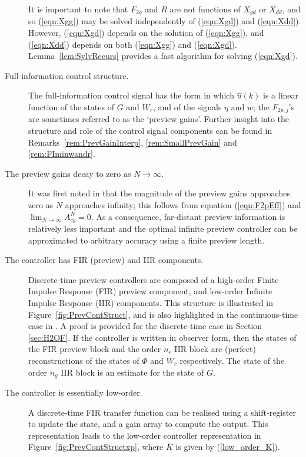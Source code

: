 \begin{description}
It is important to note that $F_{2g}$ and $\bar R$ are not functions of $X_{gd}$ or $X_{dd}$, and so (\ref{eqn:Xgg}) may be solved independently of (\ref{eqn:Xgd}) and (\ref{eqn:Xdd}). However, (\ref{eqn:Xgd}) depends on the solution of (\ref{eqn:Xgg}), and (\ref{eqn:Xdd}) depends on both (\ref{eqn:Xgg}) and (\ref{eqn:Xgd}). Lemma~\ref{lem:SylvRecurs} provides a fast algorithm for solving (\ref{eqn:Xgd}).
\item[Full-information control structure.] The full-information control signal has the form
in which $\hat u(k)$ is a linear function of the states of $G$ and $W_r$, and of the signals $\eta$ and $w$; the $F_{2p,j}$'s are sometimes referred to as the `preview gains'. Further insight into the structure and role of the control signal components can be found in Remarks~\ref{rem:PrevGainInterp}, \ref{rem:SmallPrevGain} and \ref{rem:FIminwandr}.
\item[The preview gains decay to zero as $N \rightarrow \infty$.] It was first noted in \cite{Tomizuka_1975_OptDiscretePreview} that the magnitude of the preview gains approaches zero as $N$ approaches infinity; this follows from equation (\ref{eqn:F2pEff}) and $\lim_{N \rightarrow \infty} A^N_{cg} = 0$. As a consequence, far-distant preview information is relatively less important and the optimal infinite preview controller can be approximated  to arbitrary accuracy using a finite preview length.
\item[The controller has FIR (preview) and IIR components.]
Discrete-time preview controllers are composed of a high-order Finite Impulse Response (FIR) preview component, and low-order Infinite Impulse Response (IIR) components. This structure is illustrated in Figure~\ref{fig:PrevContStruct}, and is also highlighted in the continuous-time case in \cite{Moelja_2006_H2PreviewMultiple}. A proof is provided for the discrete-time case in Section \ref{sec:H2OF}. If the controller is written in observer form, then the states of the FIR preview block and the order $n_r$ IIR block are (perfect) reconstructions of the states of $\Phi$ and $W_r$ respectively. The state of the order $n_g$ IIR block is an estimate for the state of $G$.
\item[The controller is essentially low-order.] 
A discrete-time FIR transfer function can be realised using a shift-register to update the state, and a gain array to compute the output. This representation leads to the low-order controller representation in Figure~\ref{fig:PrevContStructxp}, where $\bar{K}$ is given by (\ref{low_order_K}). 

\end{description}
